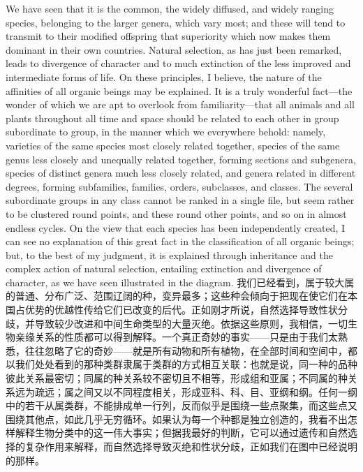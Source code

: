 \darwinpair
{We have seen that it is the common, the widely diffused, and widely ranging species, belonging to the larger genera, which vary most; and these will tend to transmit to their modified offspring that superiority which now makes them dominant in their own countries. Natural selection, as has just been remarked, leads to divergence of character and to much extinction of the less improved and intermediate forms of life. On these principles, I believe, the nature of the affinities of all organic beings may be explained. It is a truly wonderful fact—the wonder of which we are apt to overlook from familiarity—that all animals and all plants throughout all time and space should be related to each other in group subordinate to group, in the manner which we everywhere behold: namely, varieties of the same species most closely related together, species of the same genus less closely and unequally related together, forming sections and subgenera, species of distinct genera much less closely related, and genera related in different degrees, forming subfamilies, families, orders, subclasses, and classes. The several subordinate groups in any class cannot be ranked in a single file, but seem rather to be clustered round points, and these round other points, and so on in almost endless cycles. On the view that each species has been independently created, I can see no explanation of this great fact in the classification of all organic beings; but, to the best of my judgment, it is explained through inheritance and the complex action of natural selection, entailing extinction and divergence of character, as we have seen illustrated in the diagram.}
{我们已经看到，属于较大属的普通、分布广泛、范围辽阔的种，变异最多；这些种会倾向于把现在使它们在本国占优势的优越性传给它们已改变的后代。正如刚才所说，自然选择导致性状分歧，并导致较少改进和中间生命类型的大量灭绝。依据这些原则，我相信，一切生物亲缘关系的性质都可以得到解释。一个真正奇妙的事实——只是由于我们太熟悉，往往忽略了它的奇妙——就是所有动物和所有植物，在全部时间和空间中，都以我们处处看到的那种类群隶属于类群的方式相互关联：也就是说，同一种的品种彼此关系最密切；同属的种关系较不密切且不相等，形成组和亚属；不同属的种关系远为疏远；属之间又以不同程度相关，形成亚科、科、目、亚纲和纲。任何一纲中的若干从属类群，不能排成单一行列，反而似乎是围绕一些点聚集，而这些点又围绕其他点，如此几乎无穷循环。如果认为每一个种都是独立创造的，我看不出怎样解释生物分类中的这一伟大事实；但据我最好的判断，它可以通过遗传和自然选择的复杂作用来解释，而自然选择导致灭绝和性状分歧，正如我们在图中已经说明的那样。}

